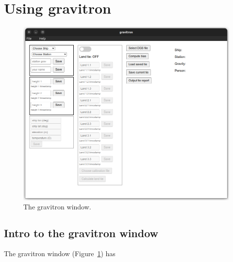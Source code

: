 \documentclass{pfpe-manual}
\begin{document}
\section{Using gravitron}

\begin{figure}[ht!]
\centering
\includegraphics[width=\textwidth]{figs/gravitron_window.png}
\caption{The gravitron window.}
\label{fig:window}
\end{figure}

\subsection{Intro to the gravitron window}

The gravitron window (Figure~\ref{fig:window}) has %
%
%
\end{document}
